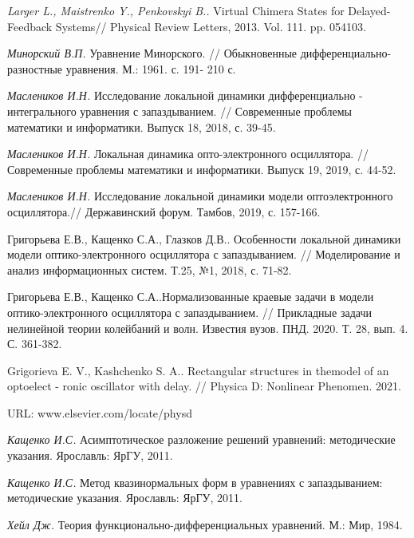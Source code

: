 \documentclass[12pt]{article} %
\begin{document}
\begin{enumerate}


{\it Larger L., Maistrenko Y., Penkovskyi B..} Virtual Chimera States for Delayed-Feedback
Systems// Physical Review Letters, 2013. Vol. 111. pp. 054103.

{\it Минорский В.П.} Уравнение Минорского. // Обыкновенные дифференциально-разностные уравнения. М.: 1961. с. 191- 210 с.


{\it Маслеников И.Н.} Исследование локальной динамики дифференциально - интегрального уравнения с запаздыванием. // Современные проблемы математики и информатики. Выпуск 18, 2018, с. 39-45.

{\it Маслеников И.Н.} Локальная динамика опто-электронного осциллятора. // Современные проблемы математики и информатики. Выпуск 19, 2019, с. 44-52.

{\it Маслеников И.Н.} Исследование локальной динамики модели оптоэлектронного осциллятора.// Державинский форум. Тамбов, 2019, с. 157-166.



Григорьева Е.В., Кащенко С.А., Глазков Д.В.. Особенности локальной динамики модели оптико-электронного осциллятора с запаздыванием. // Моделирование и анализ информационных систем. Т.25, №1, 2018, с. 71-82.

Григорьева Е.В., Кащенко С.А..Нормализованные краевые задачи в модели оптико-электронного осциллятора с запаздыванием. // Прикладные задачи нелинейной теории колейбаний и волн. Известия вузов. ПНД. 2020. Т. 28, вып. 4. С. 361-382.

Grigorieva E. V.,  Kashchenko S. A.. Rectangular structures in themodel of an optoelect - ronic oscillator with delay. // Physica D: Nonlinear Phenomen. 2021. 

URL:  www.elsevier.com/locate/physd 



{\it Кащенко И.С.} Асимптотическое разложение решений уравнений: методические указания. Ярославль: ЯрГУ, 2011.

{\it Кащенко И.С.} Метод квазинормальных форм в уравнениях с запаздыванием: методические указания. Ярославль: ЯрГУ, 2011.


{\it Хейл Дж.} Теория функционально-дифференциальных уравнений. М.: Мир, 1984.

\end{enumerate}
\end{document}
